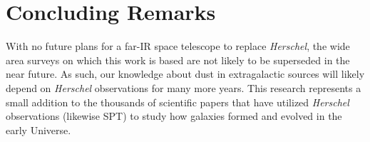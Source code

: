 \section{Concluding Remarks}

With no future plans for a far-IR space telescope to replace \textit{Herschel}, the wide area surveys on which this work is based are not likely to be superseded in the near future. As such, our knowledge about dust in extragalactic sources will likely depend on \textit{Herschel} observations for many more years. This research represents a small addition to the thousands of scientific papers that have utilized \textit{Herschel} observations (likewise SPT) to study how galaxies formed and evolved in the early Universe.
